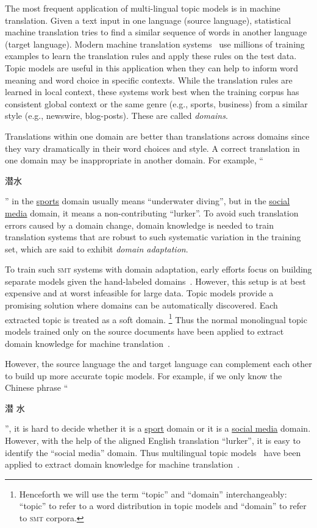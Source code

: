 The most frequent application of multi-lingual topic models is in machine translation.
Given a text input in one language (source language), statistical
machine translation tries to find a similar sequence of words in another
language (target language). Modern machine translation
systems~\citep{koehn-09} use millions of training examples to learn
the translation rules and apply these rules on the test data. 
Topic models are useful in this application when they can help to inform word meaning and word choice in specific contexts.
While the translation rules are learned in local context, these systems work
best when the training corpus has consistent global context or the
same genre (e.g., sports, business) from a similar style (e.g.,
newswire, blog-posts).  These are called \emph{domains}.

Translations within one domain are better than translations across
domains since they vary dramatically in their word choices and style.
A correct translation in one domain may be inappropriate in another
domain.  For example, ``\begin{CJK*}{UTF8}{gbsn}潜水\end{CJK*}'' in the
  \underline{sports} domain usually means ``underwater diving'', but
  in the \underline{social media} domain, it means a non-contributing
  ``lurker''. To avoid such translation errors caused by a domain
  change, domain knowledge is needed to train translation systems that
  are robust to such systematic variation in the training set, which
  are said to exhibit \emph{domain adaptation}.

To train such \textsc{smt} systems with domain adaptation, early
efforts focus on building separate models given the hand-labeled
domains~\citep{foster-07,matsoukas-09,chiang-11}. However, this setup
is at best expensive and at worst infeasible for large data.  Topic
models provide a promising solution where domains can be automatically
discovered. Each extracted topic is treated as a soft
domain. \footnote{Henceforth we will use the term ``topic'' and
  ``domain'' interchangeably: ``topic'' to refer to  a word distribution in
  topic models and ``domain'' to refer to \textsc{smt} corpora.} Thus
the normal monolingual topic models trained only on the source documents have
been applied to extract domain knowledge for machine
translation~\citep{Eidelman-12}.

However, the source language the and target language can complement
each other to build up more accurate topic models. For example, if we
only know the Chinese phrase ``\begin{CJK*}{UTF8}{gbsn}潜
  水\end{CJK*}'', it is hard to decide whether it is a
  \underline{sport} domain or it is a \underline{social media}
  domain. However, with the help of the aligned English translation
  ``lurker'', it is easy to identify the ``social media'' domain. Thus
  multilingual topic models~\citep{mimno-09,boyd-graber-10} have been
  applied to extract domain knowledge for machine
  translation~\citep{hu-14}.

